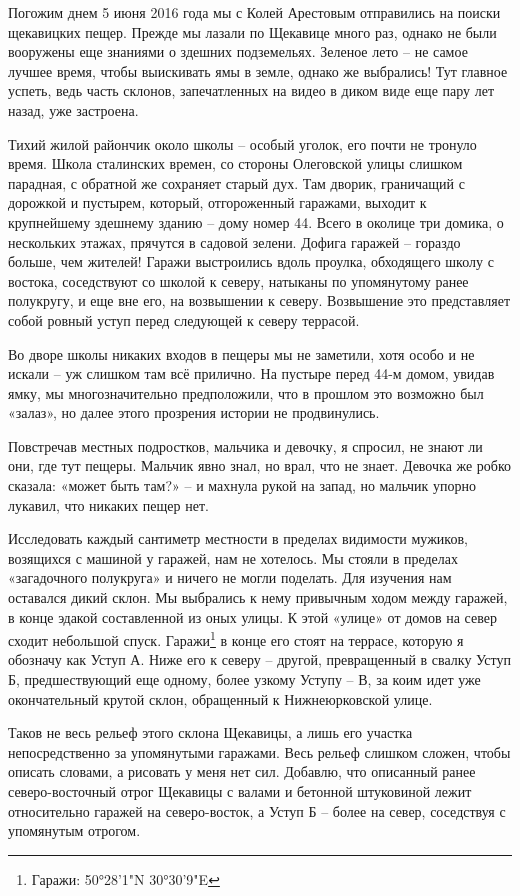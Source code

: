 Погожим днем 5 июня 2016 года мы с Колей Арестовым отправились на поиски щекавицких пещер. Прежде мы лазали по Щекавице много раз, однако не были вооружены еще знаниями о здешних подземельях. Зеленое лето – не самое лучшее время, чтобы выискивать ямы в земле, однако же выбрались! Тут главное успеть, ведь часть склонов, запечатленных на видео в диком виде еще пару лет назад, уже застроена.

Тихий жилой райончик около школы – особый уголок, его почти не тронуло время. Школа сталинских времен, со стороны Олеговской улицы слишком парадная, с обратной же сохраняет старый дух. Там дворик, граничащий с дорожкой и пустырем, который, отгороженный гаражами, выходит к крупнейшему здешнему зданию – дому номер 44. Всего в околице три домика, о нескольких этажах, прячутся в садовой зелени. Дофига гаражей – гораздо больше, чем жителей! Гаражи выстроились вдоль проулка, обходящего школу с востока, соседствуют со школой к северу, натыканы по упомянутому ранее полукругу, и еще вне его, на возвышении к северу. Возвышение это представляет собой ровный уступ перед следующей к северу террасой.

Во дворе школы никаких входов в пещеры мы не заметили, хотя особо и не искали – уж слишком там всё прилично. На пустыре перед 44-м домом, увидав ямку, мы многозначительно предположили, что в прошлом это возможно был «залаз», но далее этого прозрения истории не продвинулись.

Повстречав местных подростков, мальчика и девочку, я спросил, не знают ли они, где тут пещеры. Мальчик явно знал, но врал, что не знает. Девочка же робко сказала: «может быть там?» – и махнула рукой на запад, но мальчик упорно лукавил, что никаких пещер нет.
 
Исследовать каждый сантиметр местности в пределах видимости мужиков, возящихся с машиной у гаражей, нам не хотелось. Мы стояли в пределах «загадочного полукруга» и ничего не могли поделать. Для изучения нам оставался дикий склон. Мы выбрались к нему привычным ходом между гаражей, в конце эдакой составленной из оных улицы. К этой «улице» от домов на север сходит небольшой спуск. Гаражи\footnote{Гаражи: 50°28'1"N 30°30'9"E} в конце его стоят на террасе, которую я обозначу как Уступ А. Ниже его к северу – другой, превращенный в свалку Уступ Б, предшествующий еще одному, более узкому Уступу – В, за коим идет уже окончательный крутой склон, обращенный к Нижнеюрковской улице.

Таков не весь рельеф этого склона Щекавицы, а лишь его участка непосредственно за упомянутыми гаражами. Весь рельеф слишком сложен, чтобы описать словами, а рисовать у меня нет сил. Добавлю, что описанный ранее северо-восточный отрог Щекавицы с валами и бетонной штуковиной лежит относительно гаражей на северо-восток, а Уступ Б – более на север, соседствуя с упомянутым отрогом.

